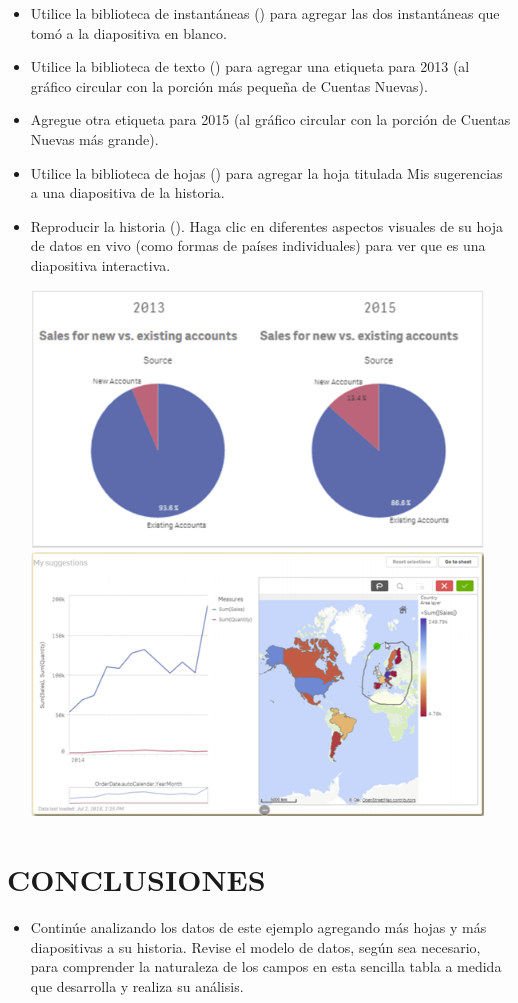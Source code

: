 \documentclass[12pt,letterpaper]{article}
\begin{document}
\begin{enumerate}
\begin{itemize}
        \item Utilice la biblioteca de instantáneas () para agregar las dos instantáneas que tomó a la diapositiva en blanco.
        \item Utilice la biblioteca de texto () para agregar una etiqueta para 2013 (al gráfico circular con la porción más pequeña de Cuentas Nuevas).
        \item Agregue otra etiqueta para 2015 (al gráfico circular con la porción de Cuentas Nuevas más grande).
        \item Utilice la biblioteca de hojas () para agregar la hoja titulada Mis sugerencias a una diapositiva de la historia.
        \item Reproducir la historia (). Haga clic en diferentes aspectos visuales de su hoja de datos en vivo (como formas de países individuales) para ver que es una diapositiva interactiva.
        \begin{center}
            \includegraphics[width=12cm]{./img/image12.png}
            \includegraphics[width=12cm]{./img/image13.png}  
        \end{center}
    \end{itemize}
    
\section{CONCLUSIONES}
\begin{itemize}
    \item Continúe analizando los datos de este ejemplo agregando más hojas y más diapositivas a su historia. Revise el modelo de datos, según sea necesario, para comprender la naturaleza de los campos en esta sencilla tabla a medida que desarrolla y realiza su análisis.\\
\end{itemize}
\end{enumerate}

\end{document}
